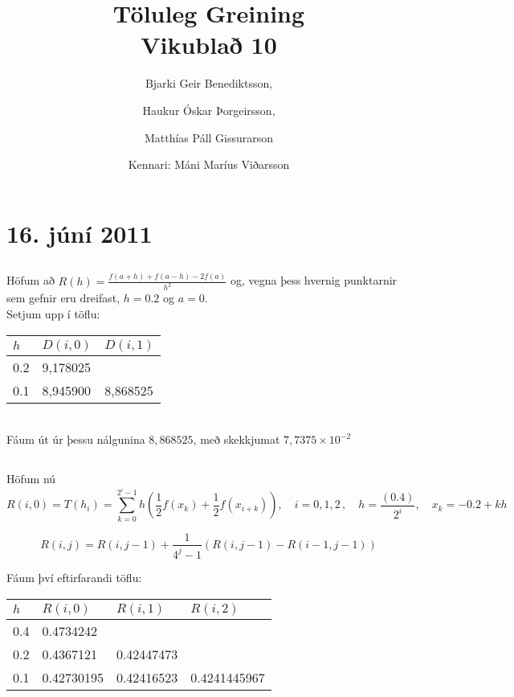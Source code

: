 \documentclass[10pt,a4paper]{article}
\begin{document}
\title{Töluleg Greining\\Vikublað 10}
\author{ 
  Bjarki Geir Benediktsson,\and
  Haukur Óskar Þorgeirsson,\and
  Matthías Páll Gissurarson \and
  Kennari: Máni Maríus Viðarsson
  }
\maketitle

\setcounter{section}{8}

\section{16. júní 2011}

\subsection{}

Höfum að $R(h) = \frac{f(a+h) + f(a-h) - 2f(a)}{h^2}$ og, vegna þess hvernig punktarnir sem gefnir eru dreifast, $h=0.2$ og $a=0$.\\

Setjum upp í töflu:

\begin{tabular}{l|ll}
$h$&$D(i,0)$&$D(i,1)$\\ \hline
0.2&9,178025\\
0.1&8,945900&8,868525\\
\end{tabular}\\

Fáum út úr þessu nálgunina $8,868525$, með skekkjumat $7,7375 \times 10^{-2}$

\subsection{}

Höfum nú 
\[R(i,0)=T(h_i)=\sum_{k=0}^{2^i-1}h(\frac{1}{2}f(x_k) + \frac{1}{2}f(x_{i+k})),\quad i=0,1,2\, , \quad h=\frac{(0.4)}{2^i},\quad x_k =  -0.2 + kh\]

\[
R(i,j)=R(i,j-1) + \frac{1}{4^j-1}(R(i,j-1)-R(i-1,j-1))
\]

Fáum því eftirfarandi töflu:

\begin{tabular}{l|lll}
$h$&$R(i,0)$&$R(i,1)$&$R(i,2)$\\ \hline
0.4&0.4734242\\
0.2&0.4367121&0.42447473\\
0.1&0.42730195&0.42416523&0.4241445967\\
\end{tabular}
\end{document}
